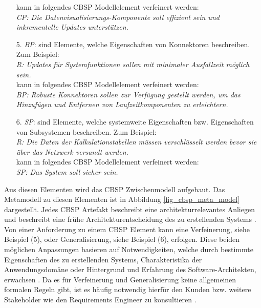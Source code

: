 \begin{itemize}
	kann in folgendes CBSP Modellelement verfeinert werden: \\
	\textit{CP: Die Datenvisualisierungs-Komponente soll effizient sein und inkrementelle Updates unterst\"utzen.} \cite{Gru01}
\item[5.] \textit{BP}: sind Elemente, welche Eigenschaften von Konnektoren beschreiben. Zum Beispiel: \\
	\textit{R: Updates f\"ur Systemfunktionen sollen mit minimaler Ausfallzeit m\"oglich sein.} \\
	kann in folgendes CBSP Modellelement verfeinert werden: \\
	\textit{BP: Robuste Konnektoren sollen zur Verf\"ugung gestellt werden, um das Hinzuf\"ugen und Entfernen von Laufzeitkomponenten zu erleichtern.} \cite{Gru01}
\item[6.] \textit{SP}: sind Elemente, welche systemweite Eigenschaften bzw. Eigenschaften von Subsystemen beschreiben. Zum Beispiel: \\
	\textit{R: Die Daten der Kalkulationstabellen m\"ussen verschl\"usselt werden bevor sie \"uber das Netzwerk versandt werden.} \\
	kann in folgendes CBSP Modellelement verfeinert werden: \\
	\textit{SP: Das System soll sicher sein.} \cite{Gru01} \\
\end{itemize}

Aus diesen Elementen wird das CBSP Zwischenmodell aufgebaut. Das Metamodell zu diesen Elementen ist in Abbildung \ref{fig_cbsp_meta_model} dargestellt. Jedes CBSP Artefakt beschreibt eine architekturrelevantes Anliegen und beschreibt eine fr\"uhe Architekturentscheidung des zu erstellenden Systems \cite{Gru01}. \\

Von einer Anforderung zu einem CBSP Element kann eine Verfeinerung, siehe Beispiel (5), oder Generalisierung, siehe Beispiel (6), erfolgen. Diese beiden m\"oglichen Anpassungen basieren auf Notwendigkeiten, welche durch bestimmte Eigenschaften des zu erstellenden Systems, Charakteristika der Anwendungsdom\"ane oder Hintergrund und Erfahrung des Software-Architekten, erwachsen \cite{Gru01}. Da es f\"ur Verfeinerung und Generalisierung keine allgemeinen formalen Regeln gibt, ist es h\"aufig notwendig hierf\"ur den Kunden bzw. weitere Stakeholder wie den Requirements Engineer zu konsultieren \cite{Gru01}. 

